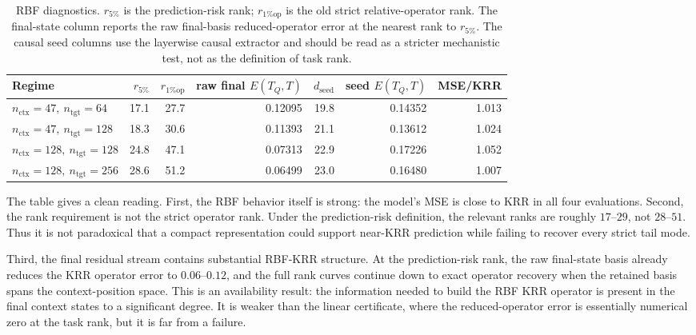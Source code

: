 \documentclass[11pt]{article}
\begin{document}
\begin{table}[htbp]
\centering
\caption{RBF diagnostics. \(r_{5\%}\) is the prediction-risk rank; \(r_{1\%\mathrm{op}}\) is the old
strict relative-operator rank. The final-state column reports the raw final-basis reduced-operator
error at the nearest rank to \(r_{5\%}\). The causal seed columns use the layerwise causal extractor
and should be read as a stricter mechanistic test, not as the definition of task rank.}
\scriptsize
\setlength{\tabcolsep}{3pt}
\renewcommand{\arraystretch}{0.9}
\begin{tabular}{lrrrrrr}
\toprule
Regime & \(r_{5\%}\) & \(r_{1\%\mathrm{op}}\) & raw final \(E(T_Q,T)\) &
\(d_{\mathrm{seed}}\) & seed \(E(T_Q,T)\) & MSE/KRR\\
\midrule
\(n_{\mathrm{ctx}}=47,\ n_{\mathrm{tgt}}=64\)   & 17.1 & 27.7 & 0.12095 & 19.8 & 0.14352 & 1.013\\
\(n_{\mathrm{ctx}}=47,\ n_{\mathrm{tgt}}=128\)  & 18.3 & 30.6 & 0.11393 & 21.1 & 0.13612 & 1.024\\
\(n_{\mathrm{ctx}}=128,\ n_{\mathrm{tgt}}=128\) & 24.8 & 47.1 & 0.07313 & 22.9 & 0.17226 & 1.052\\
\(n_{\mathrm{ctx}}=128,\ n_{\mathrm{tgt}}=256\) & 28.6 & 51.2 & 0.06499 & 23.0 & 0.16480 & 1.007\\
\bottomrule
\end{tabular}
\renewcommand{\arraystretch}{1}
\end{table}

The table gives a clean reading. First, the RBF behavior itself is strong: the model's MSE is close
to KRR in all four evaluations. Second, the rank requirement is not the strict operator rank. Under
the prediction-risk definition, the relevant ranks are roughly \(17\)--\(29\), not \(28\)--\(51\).
Thus it is not paradoxical that a compact representation could support near-KRR prediction while
failing to recover every strict tail mode.

Third, the final residual stream contains substantial RBF-KRR structure. At the prediction-risk
rank, the raw final-state basis already reduces the KRR operator error to \(0.06\)--\(0.12\), and
the full rank curves continue down to exact operator recovery when the retained basis spans the
context-position space. This is an availability result: the information needed to build the RBF KRR
operator is present in the final context states to a significant degree. It is weaker than the linear
certificate, where the reduced-operator error is essentially numerical zero at the task rank, but it
is far from a failure.
\end{document}
